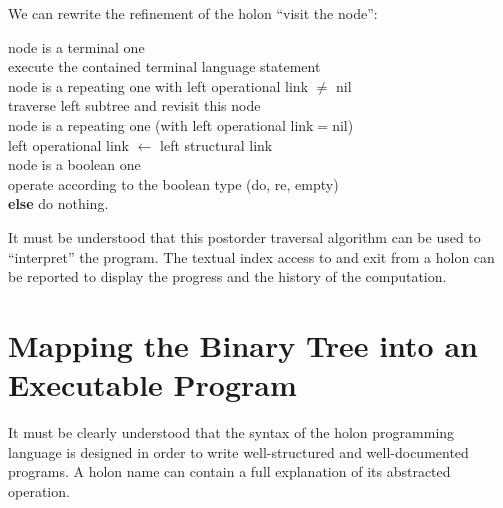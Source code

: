 \documentclass[openany,nobib]{tufte-book}
\newcommand{\kw}[1]{{\bf #1}}
\begin{document}
We can rewrite the refinement of the holon ``visit the node'':

\smallskip

\noindent\-\hspace{0.4cm}\kw{case} node is a terminal one\\
\noindent\-\hspace{0.7cm}\kw{then} execute the contained terminal language
statement\\
\noindent\-\hspace{0.4cm}\kw{eor} node is a repeating one with left operational
link $\neq$ nil\\
\noindent\-\hspace{0.7cm}\kw{then} traverse left subtree and revisit this
node\\
\noindent\-\hspace{0.4cm}\kw{eor} node is a repeating one (with left
operational
link$=$nil)\\
\noindent\-\hspace{0.7cm}\kw{then} left operational link $\gets$ left
structural
link\\
\noindent\-\hspace{0.4cm}\kw{eor} node is a boolean one\\
\noindent\-\hspace{0.7cm}\kw{then} operate according to the boolean type (do,
re,
empty)\\
\noindent\-\hspace{0.4cm}\kw{eor} \kw{else} do nothing.

\smallskip

It must be understood that this postorder traversal algorithm can be used to
``interpret'' the program. The textual index access to and exit from a holon
can be reported to display the progress and the history of the computation.

\bigskip


\chapter[Mapping the Binary Tree into an Executable Program]{Mapping the Binary
Tree into an\\Executable Program}

It must be clearly understood that the syntax of the holon programming
language is designed in order to write well-structured and well-documented
programs. A holon name can contain a full explanation of its abstracted
operation.
\end{document}
